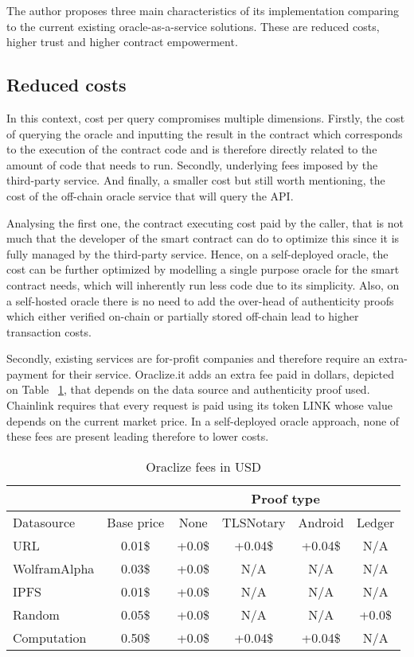 The author proposes three main characteristics of its implementation comparing to the current existing oracle-as-a-service solutions. These are reduced costs, higher trust and higher contract empowerment.



\subsection{Reduced costs}

In this context, cost per query compromises multiple dimensions. Firstly, the cost of querying the oracle and inputting the result in the contract which corresponds to the execution of the contract code and is therefore directly related to the amount of code that needs to run. Secondly, underlying fees imposed by the third-party service. And finally, a smaller cost but still worth mentioning, the cost of the off-chain oracle service that will query the API.

Analysing the first one, the contract executing cost paid by the caller, that is not much that the developer of the smart contract can do to optimize this since it is fully managed by the third-party service. Hence, on a self-deployed oracle, the cost can be further optimized by modelling a single purpose oracle for the smart contract needs, which will inherently run less code due to its simplicity. Also, on a self-hosted oracle there is no need to add the over-head of authenticity proofs which either verified on-chain or partially stored off-chain lead to higher transaction costs.

Secondly, existing services are for-profit companies and therefore require an extra-payment for their service. Oraclize.it adds an extra fee paid in dollars, depicted on Table ~\ref{tab:oraclize-fees}, that depends on the data source and authenticity proof used. Chainlink requires that every request is paid using its token LINK whose value depends on the current market price. In a self-deployed oracle approach, none of these fees are present leading therefore to lower costs.

\begin{table}[]
    \centering
    \begin{tabular}{@{}lccccc@{}}
    \cmidrule(l){3-6}
     & \multicolumn{1}{l}{} & \multicolumn{4}{c}{Proof type} \\ \midrule
    Datasource & Base price & None & TLSNotary & Android & Ledger \\ \midrule
    URL & 0.01\$ & +0.0\$ & +0.04\$ & +0.04\$ & N/A \\
    WolframAlpha & 0.03\$ & +0.0\$ & N/A & N/A & N/A \\
    IPFS & 0.01\$ & +0.0\$ & N/A & N/A & N/A \\
    Random & 0.05\$ & +0.0\$ & N/A & N/A & +0.0\$ \\
    Computation & 0.50\$ & +0.0\$ & +0.04\$ & +0.04\$ & N/A \\ \bottomrule
    \end{tabular}
    \caption{Oraclize fees in USD}
    \label{tab:oraclize-fees}
\end{table}

